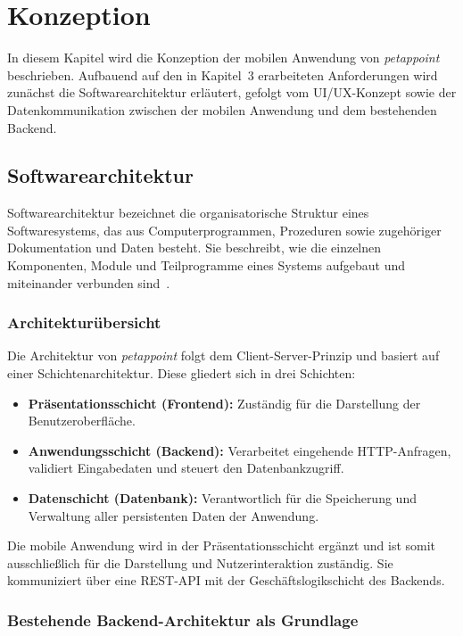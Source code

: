 \chapter{Konzeption}

In diesem Kapitel wird die Konzeption der mobilen Anwendung von 
\textit{petappoint} beschrieben. Aufbauend auf den in Kapitel~3 
erarbeiteten Anforderungen wird zunächst die Softwarearchitektur 
erläutert, gefolgt vom UI/UX-Konzept sowie der Datenkommunikation zwischen der mobilen Anwendung und dem bestehenden Backend.

\section{Softwarearchitektur}

Softwarearchitektur bezeichnet die organisatorische Struktur eines Softwaresystems, das aus Computerprogrammen, Prozeduren sowie zugehöriger Dokumentation und Daten besteht. Sie beschreibt, wie die einzelnen Komponenten, Module und Teilprogramme eines Systems aufgebaut und miteinander verbunden sind~\cite{ieee1990}.

\subsection{Architekturübersicht}

Die Architektur von \textit{petappoint} folgt dem Client-Server-Prinzip und basiert auf einer Schichtenarchitektur. Diese gliedert sich in drei Schichten: 

\begin{itemize}
    \item \textbf{Präsentationsschicht (Frontend):} Zuständig für die Darstellung der Benutzeroberfläche.
    \item \textbf{Anwendungsschicht (Backend):} Verarbeitet eingehende HTTP-Anfragen, validiert Eingabedaten und steuert den Datenbankzugriff.
    \item \textbf{Datenschicht (Datenbank):} Verantwortlich für die Speicherung und Verwaltung aller persistenten Daten der Anwendung.
\end{itemize}

Die mobile Anwendung wird in der Präsentationsschicht ergänzt und ist somit ausschließlich für die Darstellung und Nutzerinteraktion zuständig. Sie kommuniziert über eine REST-API mit der Geschäftslogikschicht des Backends.

\subsection{Bestehende Backend-Architektur als Grundlage}


